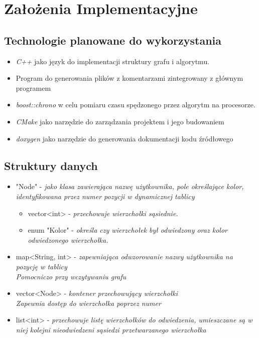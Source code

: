 \documentclass[11pt]{article}
\newcommand{\+}{\discretionary{\mbox{\scriptsize$\hookleftarrow$}}{}{}}
\begin{document}
\section{Założenia Implementacyjne}
\subsection{Technologie planowane do wykorzystania}
\begin{itemize}
\item
\textsl{C++} jako język do implementacji struktury grafu i algorytmu.
\item
Program do generowania plików z komentarzami zintegrowany z głównym programem
\item
\textsl{boost::chrono} w celu pomiaru czasu spędzonego przez algorytm na procesorze. 
\item
\textsl{CMake} jako narzędzie do zarządzania projektem i jego budowaniem
\item
\textsl{doxygen} jako narzędzie do generowania dokumentacji kodu źródłowego
\end{itemize}
\subsection{Struktury danych}
\begin{itemize}
\item
"Node" - \textsl{jako klasa zawierająca nazwę użytkownika, pole określające kolor, identyfikowana przez numer pozycji w dynamicznej tablicy}
\begin{itemize}[\textsl{W Node} :]
\item
vector<int> - \textsl{przechowuje wierzchołki sąsiednie.}
\item
enum "Kolor" - \textsl{określa czy wierzchołek był odwiedzony oraz kolor odwiedzonego wierzchołka.}
\end{itemize}
\item
map<String, int> - \textsl{zapewniająca odwzorowanie nazwy użytkownika na pozycję w tablicy} \\ 
\textsl{Pomocniczo przy wczytywaniu grafu}
\item
vector<Node> - \textsl{kontener przechowujący wierzchołki}\\ 
\textsl{Zapewnia dostęp do wierzchołka poprzez numer} 
\item 
list<int> - \textsl{przechowuje listę wierzchołków do odwiedzenia, umieszczane są w niej kolejni nieodwiedzeni sąsiedzi przetwarzanego wierzchołka}
\end{itemize}
\end{document}
